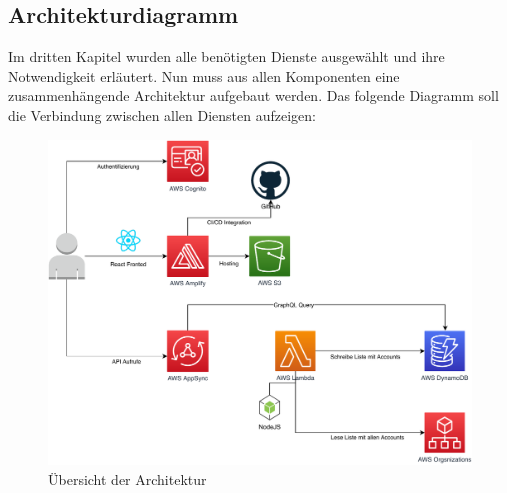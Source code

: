 \subsection{Architekturdiagramm}

Im dritten Kapitel wurden alle benötigten Dienste ausgewählt und ihre Notwendigkeit erläutert.
Nun muss aus allen Komponenten eine zusammenhängende Architektur aufgebaut werden.
Das folgende Diagramm soll die Verbindung zwischen allen Diensten aufzeigen:

\begin{figure}[htbp]
    \centering
    \includegraphics[width=1.0\textwidth]{50-Implementierung/Architektur.pdf}
    \caption{Übersicht der Architektur}
    \label{fig:meine-grafik}
\end{figure}

